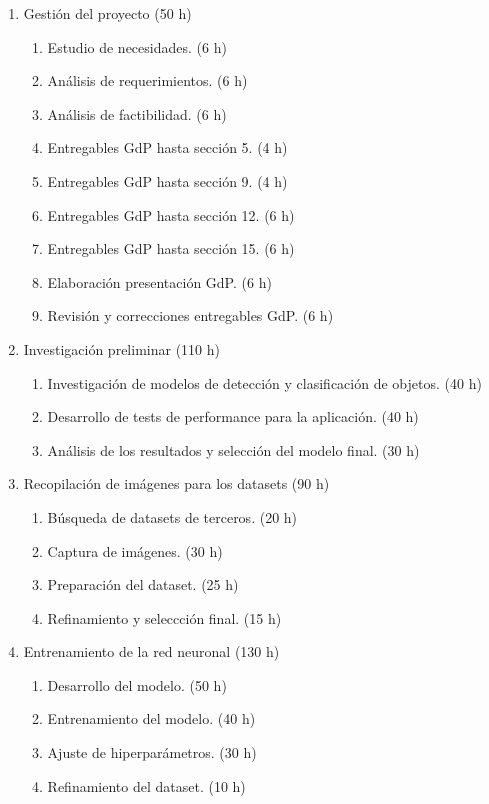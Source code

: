 \documentclass[
11pt %
]{charter}
\begin{document}
\begin{enumerate}
\item Gestión del proyecto (50 h)
	\begin{enumerate}
	\item Estudio de necesidades. (6 h)
	\item Análisis de requerimientos. (6 h)
	\item Análisis de factibilidad. (6 h)
	\item Entregables GdP hasta sección 5. (4 h)
	\item Entregables GdP hasta sección 9. (4 h)
	\item Entregables GdP hasta sección 12. (6 h)
	\item Entregables GdP hasta sección 15. (6 h)
	\item Elaboración presentación GdP. (6 h)
	\item Revisión y correcciones entregables GdP. (6 h)
	\end{enumerate}
	
\item Investigación preliminar (110 h)
	\begin{enumerate}
	\item Investigación de modelos de detección y clasificación de objetos. (40 h)
	\item Desarrollo de tests de performance para la aplicación. (40 h)
	\item Análisis de los resultados y selección del modelo final. (30 h)
	\end{enumerate}
	
\item Recopilación de imágenes para los datasets (90 h)
	\begin{enumerate}
	\item Búsqueda de datasets de terceros. (20 h)
	\item Captura de imágenes. (30 h)
	\item Preparación del dataset. (25 h)
	\item Refinamiento y seleccción final. (15 h)
	\end{enumerate}

\item Entrenamiento de la red neuronal (130 h)
	\begin{enumerate}
	\item Desarrollo del modelo. (50 h)
	\item Entrenamiento del modelo. (40 h)
	\item Ajuste de hiperparámetros. (30 h)
	\item Refinamiento del dataset. (10 h)
	\end{enumerate}
	

\end{enumerate}
\end{document}
